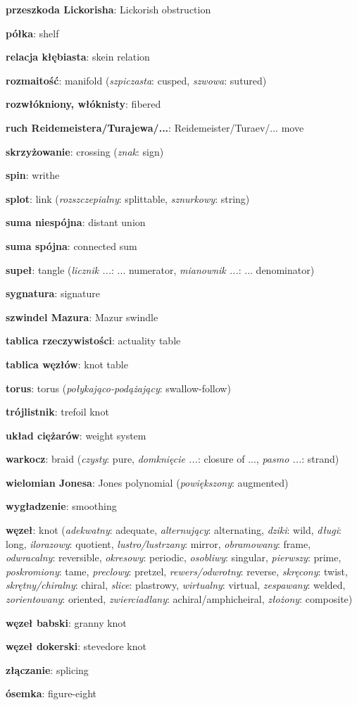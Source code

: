 \item \textbf{przeszkoda Lickorisha}: Lickorish obstruction
\item \textbf{półka}: shelf
\item \textbf{relacja kłębiasta}: skein relation
\item \textbf{rozmaitość}: manifold
(\emph{szpiczasta}: cusped, \emph{szwowa}: sutured)
\item \textbf{rozwłókniony, włóknisty}: fibered
\item \textbf{ruch Reidemeistera/Turajewa/...}: Reidemeister/Turaev/... move
\item \textbf{skrzyżowanie}: crossing
(\emph{znak}: sign)
\item \textbf{spin}: writhe
\item \textbf{splot}: link
(\emph{rozszczepialny}: splittable, \emph{sznurkowy}: string)
\item \textbf{suma niespójna}: distant union
\item \textbf{suma spójna}: connected sum
\item \textbf{supeł}: tangle
(\emph{licznik ...}: ... numerator, \emph{mianownik ...}: ... denominator)
\item \textbf{sygnatura}: signature
\item \textbf{szwindel Mazura}: Mazur swindle
\item \textbf{tablica rzeczywistości}: actuality table
\item \textbf{tablica węzłów}: knot table
\item \textbf{torus}: torus
(\emph{połykająco-podążający}: swallow-follow)
\item \textbf{trójlistnik}: trefoil knot
\item \textbf{układ ciężarów}: weight system
\item \textbf{warkocz}: braid
(\emph{czysty}: pure, \emph{domknięcie ...}: closure of ..., \emph{pasmo ...}: strand)
\item \textbf{wielomian Jonesa}: Jones polynomial
(\emph{powiększony}: augmented)
\item \textbf{wygładzenie}: smoothing
\item \textbf{węzeł}: knot
(\emph{adekwatny}: adequate, \emph{alternujący}: alternating, \emph{dziki}: wild, \emph{długi}: long, \emph{ilorazowy}: quotient, \emph{lustro/lustrzany}: mirror, \emph{obramowany}: frame, \emph{odwracalny}: reversible, \emph{okresowy}: periodic, \emph{osobliwy}: singular, \emph{pierwszy}: prime, \emph{poskromiony}: tame, \emph{preclowy}: pretzel, \emph{rewers/odwrotny}: reverse, \emph{skręcony}: twist, \emph{skrętny/chiralny}: chiral, \emph{slice}: plastrowy, \emph{wirtualny}: virtual, \emph{zespawany}: welded, \emph{zorientowany}: oriented, \emph{zwierciadlany}: achiral/amphicheiral, \emph{złożony}: composite)
\item \textbf{węzeł babski}: granny knot
\item \textbf{węzeł dokerski}: stevedore knot
\item \textbf{złączanie}: splicing
\item \textbf{ósemka}: figure-eight
